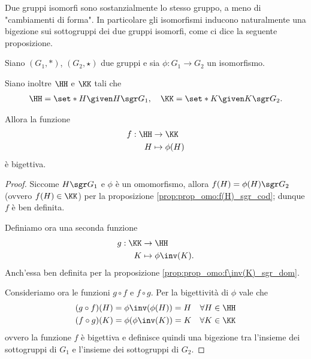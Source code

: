 Due gruppi isomorfi sono sostanzialmente lo stesso gruppo, a meno di "cambiamenti di forma". In particolare gli isomorfismi inducono naturalmente una bigezione sui sottogruppi dei due gruppi isomorfi, come ci dice la seguente proposizione.

\begin{proposition}
     \label{prop:big_sottogrp_isom}
    Siano $(G_1, *)$, $(G_2, \star)$ due gruppi e sia $\phi : G_1 \to G_2$ un isomorfismo.

    Siano inoltre $\HH$ e $\KK$ tali che \begin{align*}
        \HH = \set*{H \given H \sgr G_1}, \quad \KK = \set*{K \given K \sgr G_2}.
    \end{align*}

    Allora la funzione \begin{align*}
        f : \HH &\to \KK \\
        H &\mapsto \phi(H)
    \end{align*} è bigettiva.
\end{proposition}
\begin{proof}
    Siccome $H \sgr G_1$ e $\phi$ è un omomorfismo, allora $f(H) = \phi(H) \sgr G_2$ (ovvero $f(H) \in \KK$) per la proposizione \ref{prop:prop_omo:f(H)_sgr_cod}; dunque $f$ è ben definita.

    Definiamo ora una seconda funzione \begin{align*}
        g : \KK &\to \HH\\
        K &\mapsto \phi\inv(K).
    \end{align*} Anch'essa ben definita per la proposizione \ref{prop:prop_omo:f\inv(K)_sgr_dom}.

    Consideriamo ora le funzioni $g \circ f$ e $f \circ g$. Per la bigettività di $\phi$ vale che \begin{align*}
        &(g \circ f)(H) = \phi\inv(\phi(H)) = H &\forall H \in \HH\\
        &(f \circ g)(K) = \phi(\phi\inv(K)) = K &\forall K \in \KK
    \end{align*} ovvero la funzione $f$ è bigettiva e definisce quindi una bigezione tra l'insieme dei sottogruppi di $G_1$ e l'insieme dei sottogruppi di $G_2$.
\end{proof}

